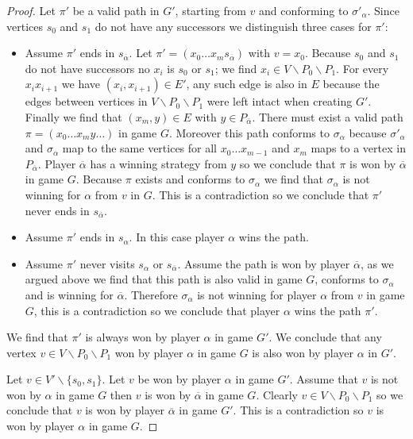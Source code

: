 \begin{lemma}
\begin{proof}
		Let $\pi'$ be a valid path in $G'$, starting from $v$ and conforming to $\sigma'_\alpha$. Since vertices $s_0$ and $s_1$ do not have any successors we distinguish three cases for $\pi'$:
		\begin{itemize}
			\item Assume $\pi'$ ends in $s_{\overline{\alpha}}$. Let $\pi' = (x_0\dots x_m s_{\overline{\alpha}})$ with $v = x_0$. Because $s_0$ and $s_1$ do not have successors no $x_i$ is $s_0$ or $s_1$; we find $x_i \in V\backslash P_0 \backslash P_1$. For every $x_ix_{i+1}$ we have $(x_i,x_{i+1}) \in E'$, any such edge is also in $E$ because the edges between vertices in $V\backslash P_0 \backslash P_1$ were left intact when creating $G'$. Finally we find that $(x_m,y) \in E$ with $y \in P_{\overline{\alpha}}$. There must exist a valid path $\pi = (x_0 \dots x_m y\dots)$ in game $G$. Moreover this path conforms to $\sigma_\alpha$ because $\sigma'_\alpha$ and $\sigma_\alpha$ map to the same vertices for all $x_0\dots x_{m-1}$ and $x_m$ maps to a vertex in $P_{\overline{\alpha}}$. Player $\overline{\alpha}$ has a winning strategy from $y$ so we conclude that $\pi$ is won by $\overline{\alpha}$ in game $G$. Because $\pi$ exists and conforms to $\sigma_\alpha$ we find that $\sigma_\alpha$ is not winning for $\alpha$ from $v$ in $G$. This is a contradiction so we conclude that $\pi'$ never ends in $s_{\overline{\alpha}}$.
			\item Assume $\pi'$ ends in $s_\alpha$. In this case player $\alpha$ wins the path.
			\item Assume $\pi'$ never visits $s_\alpha$ or $s_{\overline{\alpha}}$. Assume the path is won by player $\overline{\alpha}$, as we argued above we find that this path is also valid in game $G$, conforms to $\sigma_\alpha$ and is winning for $\overline{\alpha}$. Therefore $\sigma_\alpha$ is not winning for player $\alpha$ from $v$ in game $G$, this is a contradiction so we conclude that player ${\alpha}$ wins the path $\pi'$.
		\end{itemize}
		We find that $\pi'$ is always won by player $\alpha$ in game $G'$. We conclude that any vertex $v \in V \backslash P_0 \backslash P_1$ won by player $\alpha$ in game $G$ is also won by player $\alpha$ in $G'$. 
		
		Let $v \in V'\backslash \{s_0,s_1\}$. Let $v$ be won by player $\alpha$ in game $G'$. Assume that $v$ is not won by $\alpha$ in game $G$ then $v$ is won by $\overline{\alpha}$ in game $G$. Clearly $v \in V \backslash P_0 \backslash P_1$ so we conclude that $v$ is won by player $\overline{\alpha}$ in game $G'$. This is a contradiction so $v$ is won by player $\alpha$ in game $G$.
	\end{proof}
\end{lemma}

